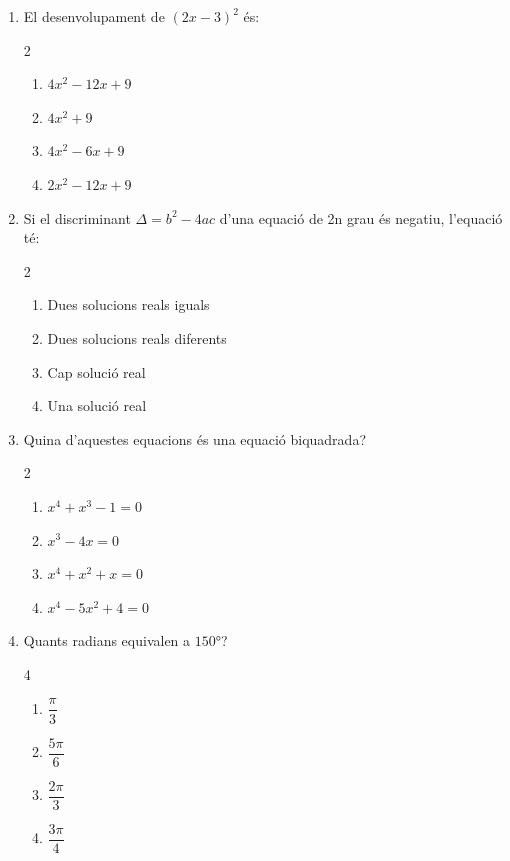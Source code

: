 \documentclass[a4paper, 11pt]{article}
\begin{document}
\begin{enumerate}[label=\textbf{\arabic*.}, itemsep=1em]

    \item El desenvolupament de $(2x - 3)^2$ és:
    \begin{multicols}{2}
    \begin{enumerate}[label=\textbf{\Alph*)}, itemsep=0.3em]
        \item $4x^2 - 12x + 9$
        \item $4x^2 + 9$
        \item $4x^2 - 6x + 9$
        \item $2x^2 - 12x + 9$
    \end{enumerate}
    \end{multicols}

    \item Si el discriminant $\Delta = b^2 - 4ac$ d'una equació de 2n grau és negatiu, l'equació té:
    \begin{multicols}{2}
    \begin{enumerate}[label=\textbf{\Alph*)}, itemsep=0.3em]
        \item Dues solucions reals iguals
        \item Dues solucions reals diferents
        \item Cap solució real
        \item Una solució real
    \end{enumerate}
    \end{multicols}

    \item Quina d'aquestes equacions és una equació biquadrada?
    \begin{multicols}{2}
    \begin{enumerate}[label=\textbf{\Alph*)}, itemsep=0.3em]
        \item $x^4 + x^3 - 1 = 0$
        \item $x^3 - 4x = 0$
        \item $x^4 + x^2 + x = 0$
        \item $x^4 - 5x^2 + 4 = 0$
    \end{enumerate}
    \end{multicols}

    \item Quants radians equivalen a $150°$?
    \begin{multicols}{4}
    \begin{enumerate}[label=\textbf{\Alph*)}, itemsep=0.3em]
        \item $\dfrac{\pi}{3}$
        \item $\dfrac{5\pi}{6}$
        \item $\dfrac{2\pi}{3}$
        \item $\dfrac{3\pi}{4}$
    \end{enumerate}
    \end{multicols}


\end{enumerate}
\end{document}
